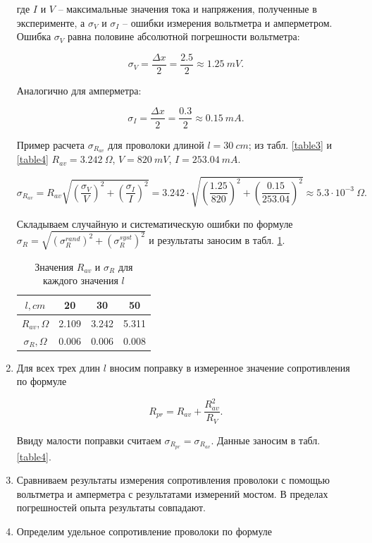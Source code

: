 \documentclass[14pt, a4paper]{article}
\begin{document}
\begin{enumerate}
где $I$ и $V$ -- максимальные значения тока и напряжения, полученные в эксперименте, а $\sigma_V$ и $\sigma_I$ -- ошибки измерения вольтметра и амперметром. Ошибка $\sigma_V$ равна половине абсолютной погрешности вольтметра:

\[\sigma_V=\frac{\Delta x}{2}=\frac{2.5}{2}\approx1.25\ mV.\]

Аналогично для амперметра:

\[\sigma_I=\frac{\Delta x}{2}=\frac{0.3}{2}\approx0.15\ mA.\]

Пример расчета $\sigma_{R_{av}}$ для проволоки длиной $l=30\ 	cm$; из табл. \ref{table3} и \ref{table4} $R_{av}=3.242\ \Omega$, $V=820\ mV$, $I=253.04\ mA$.

\[\sigma_{R_{av}}=R_{av}\sqrt{\left(\frac{\sigma_V}{V}\right)^2+\left(\frac{\sigma_I}{I}\right)^2}=3.242\cdot\sqrt{\left(\frac{1.25}{820}\right)^2+\left(\frac{0.15}{253.04}\right)^2}\approx5.3\cdot10^{-3}\ \Omega.\]

Складываем случайную и систематическую ошибки по формуле $\sigma_R=\sqrt{(\sigma_R^{rand})^2+(\sigma_R^{syst})^2}$  и результаты заносим в табл. \ref{table5}.

\begin{table}[!h]
\centering
\begin{tabular}{| c | c | c | c |}
\hline
$l, cm$ & 20 & 30 & 50 \\
\hline
$R_{av}, \Omega$ & 2.109 & 3.242 & 5.311 \\
\hline
$\sigma_R, \Omega$ & 0.006 & 0.006 & 0.008 \\
\hline
\end{tabular}
\caption{Значения $R_{av}$ и $\sigma_R$ для каждого значения $l$}
\label{table5}
\end{table}

\item Для всех трех длин $l$ вносим поправку в измеренное значение сопротивления по формуле

\[R_{pr}=R_{av}+\frac{R_{av}^2}{R_V}.\]

Ввиду малости поправки считаем $\sigma_{R_{pr}}=\sigma_{R_{av}}$. Данные заносим в табл. \ref{table4}.

\item Сравниваем результаты измерения сопротивления проволоки с помощью вольтметра и амперметра с результатами измерений мостом. В пределах погрешностей опыта результаты совпадают.

\item Определим удельное сопротивление проволоки по формуле


\end{enumerate}
\end{document}
